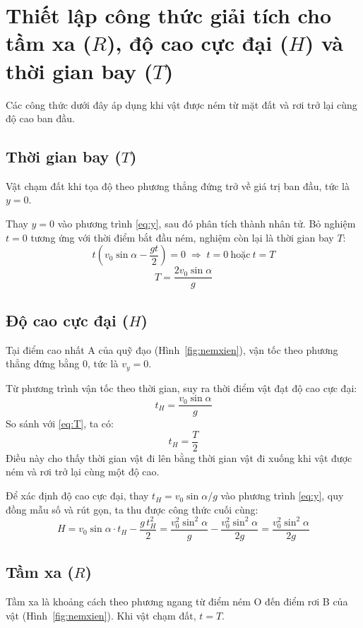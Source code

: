 \section{Thiết lập công thức giải tích cho tầm xa \texorpdfstring{($R$)}{(R)}, độ cao cực đại \texorpdfstring{($H$)}{(H)} và thời gian bay \texorpdfstring{($T$)}{(T)}}
Các công thức dưới đây áp dụng khi vật được ném từ mặt đất và rơi trở lại cùng độ cao ban đầu.

\subsection{Thời gian bay \texorpdfstring{($T$)}{(T)}}
Vật chạm đất khi tọa độ theo phương thẳng đứng trở về giá trị ban đầu, tức là $y = 0$.

Thay $y = 0$ vào phương trình \eqref{eq:y}, sau đó phân tích thành nhân tử. Bỏ nghiệm $t = 0$ tương ứng với thời điểm bắt đầu ném, nghiệm còn lại là thời gian bay $T$:
\[ t\left(v_0\sin\alpha - \frac{gt}{2}\right) = 0 \;\Rightarrow\; t = 0 \ \text{hoặc}\ t = T \]
\begin{equation}
  T = \frac{2v_0\sin\alpha}{g}
  \label{eq:T}
\end{equation}

\subsection{Độ cao cực đại \texorpdfstring{($H$)}{(H)}}
Tại điểm cao nhất A của quỹ đạo (Hình~\ref{fig:nemxien}), vận tốc theo phương thẳng đứng bằng 0, tức là $v_y = 0$.

Từ phương trình vận tốc theo thời gian, suy ra thời điểm vật đạt độ cao cực đại:
\[ t_H = \frac{v_0\sin\alpha}{g} \]
So sánh với \eqref{eq:T}, ta có:
\[ t_H = \frac{T}{2} \]
Điều này cho thấy thời gian vật đi lên bằng thời gian vật đi xuống khi vật được ném và rơi trở lại cùng một độ cao.

Để xác định độ cao cực đại, thay $t_H = v_0\sin\alpha/g$ vào phương trình \eqref{eq:y}, quy đồng mẫu số và rút gọn, ta thu được công thức cuối cùng:
\begin{equation}
  H = v_0\sin\alpha\cdot t_H - \frac{g\,t_H^2}{2}
    = \frac{v_0^2\sin^2\alpha}{g} - \frac{v_0^2\sin^2\alpha}{2g}
    = \frac{v_0^2\sin^2\alpha}{2g}
  \label{eq:H}
\end{equation}

\subsection{Tầm xa \texorpdfstring{($R$)}{(R)}}
Tầm xa là khoảng cách theo phương ngang từ điểm ném O đến điểm rơi B của vật (Hình~\ref{fig:nemxien}). Khi vật chạm đất, $t = T$.

